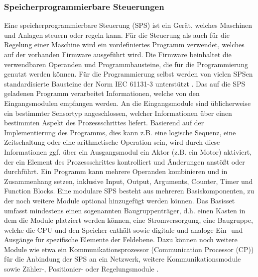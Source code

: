 \subsubsection{Speicherprogrammierbare Steuerungen}
Eine speicherprogrammierbare Steuerung (SPS) ist ein Gerät, welches Maschinen und Anlagen steuern oder regeln kann. Für die Steuerung als auch für die Regelung einer Maschine wird ein vordefiniertes Programm verwendet, welches auf der vorhanden Firmware ausgeführt wird. Die Firmware beinhaltet die verwendbaren Operanden und Programmbausteine, die für die Programmierung genutzt werden können. Für die Programmierung selbst werden von vielen SPSen standardisierte Bausteine der Norm IEC 61131-3 unterstützt \citep{Hoenle2017}.
Das auf die SPS geladenen Programm verarbeitet Informationen, welche von den Eingangsmodulen empfangen werden. An die Eingangsmodule sind üblicherweise ein bestimmter Sensortyp angeschlossen, welcher Informationen über einen bestimmten Aspekt des Prozessschrittes liefert. Basierend auf der Implementierung des Programms, dies kann z.B. eine logische Sequenz, eine Zeitschaltung oder eine arithmetische Operation sein, wird durch diese Informationen ggf. über ein Ausgangsmodul ein Aktor (z.B. ein Motor) aktiviert, der ein Element des Prozessschrittes kontrolliert und Änderungen anstößt oder durchführt. Ein Programm kann mehrere Operanden kombinieren und in Zusammenhang setzen, inklusive Input, Output, Arguments, Counter, Timer und Function Blocks.
Eine modulare SPS besteht aus mehreren Basiskomponenten, zu der noch weitere Module optional hinzugefügt werden können. Das Basisset umfasst mindestens einen sogenannten Baugruppenträger, d.h. einen Kasten in dem die Module platziert werden können, eine Stromversorgung, eine Baugruppe, welche die CPU und den Speicher enthält sowie digitale und analoge Ein- und Ausgänge für spezifische Elemente der Feldebene. 
Dazu können noch weitere Module wie etwa ein Kommunikationsprozessor (Communication Processor (CP)) 
für die Anbindung der SPS an ein Netzwerk, weitere Kommunikationsmodule sowie Zähler-, Positionier- oder Regelungsmodule \citep{Hoenle2017}. 

